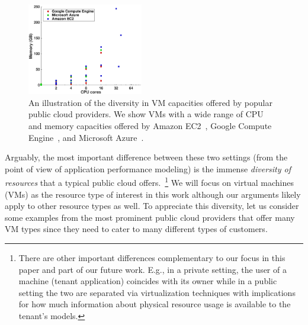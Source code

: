 \begin{figure}[htbp]
\centering
\includegraphics[width=0.45\textwidth]{cloud_vm_types.eps}
\caption{An illustration of the diversity in VM capacities offered by popular public cloud providers. We show VMs with a wide range of CPU and memory capacities offered by Amazon EC2~\cite{amazon-ec2}, Google Compute Engine~\cite{google-computeengine}, and Microsoft Azure~\cite{windows-azure}.} \label{fig:diversity}
\end{figure}


Arguably, the most important difference between  these two settings (from the point of view of application performance modeling) is the immense {\it diversity of resources} that a typical public cloud offers.~\footnote{There are other important differences complementary to our focus in this paper and part of our future work. E.g., in a private setting, the user of a machine (tenant application) coincides with its owner while in a public setting the two are separated via virtualization techniques with implications for how much information about physical resource usage is available to the tenant's models. } We will focus on virtual machines (VMs) as the resource type of interest in this work although our arguments likely apply to other resource types as well. To appreciate this diversity, let us consider some examples from the most prominent public cloud providers that offer many VM types since they need to cater to many different types of customers.  ~ 

